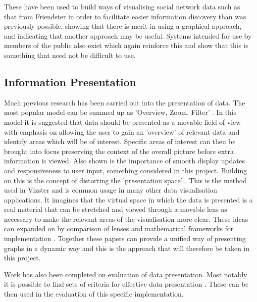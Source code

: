 \documentclass[12pt,a4paper]{article}
\begin{document}
These have been used to build ways of visualising social network data such as that from Friendster \cite{heer2005vizster} in order to facilitate easier information discovery than was previously possible, showing that there is merit in using a graphical approach, and indicating that another approach may be useful. Systems intended for use by members of the public also exist \cite{wolfram} which again reinforce this and show that this is something that need not be difficult to use.

\subsection{Information Presentation}
\noindent
Much previous research has been carried out into the presentation of data. The most popular model can be summed up as 'Overview, Zoom, Filter' \cite{shneiderman1996eyes}. In this model it is suggested that data should be presented as a movable field of view with emphasis on allowing the user to gain an 'overview' of relevant data and identify areas which will be of interest. Specific areas of interest can then be brought into focus preserving the context of the overall picture before extra information is viewed. Also shown is the importance of smooth display updates and responsiveness to user input, something considered in this project. Building on this is the concept of distorting the 'presentation space' \cite{carpendale2001framework}. This is the method used in Vizster and is common usage in many other data visualisation applications. It imagines that the virtual space in which the data is presented is a real material that can be stretched and viewed through a movable lens as necessary to make the relevant areas of the visualisation more clear. These ideas can expanded on by comparison of lenses and mathematical frameworks for implementation \cite{leung1994review}. Together these papers can provide a unified way of presenting graphs in a dynamic way and this is the approach that will therefore be taken in this project.

Work has also been completed on evaluation of data presentation. Most notably it is possible to find sets of criteria for effective data presentation \cite{tufte1983visual}. These can be then used in the evaluation of this specific implementation.
\end{document}
